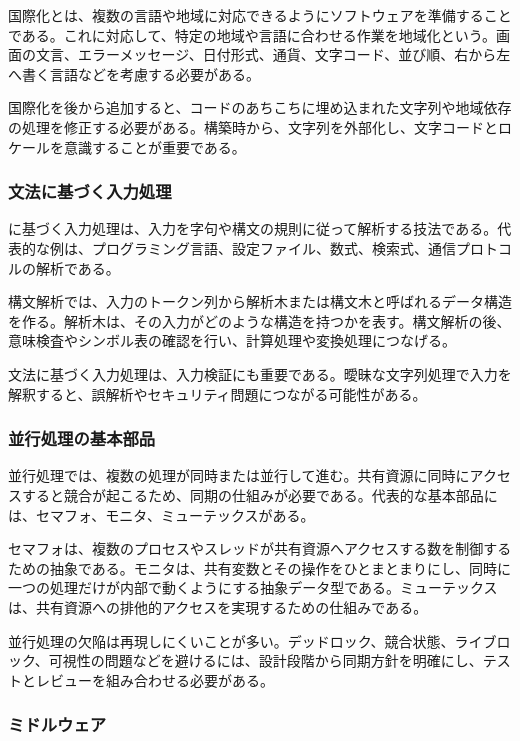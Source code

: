 \documentclass[a4paper,11pt]{ltjsarticle}
\numberwithin{figure}{section}
\numberwithin{table}{section}
\begin{document}
国際化とは、複数の言語や地域に対応できるようにソフトウェアを準備することである。これに対応して、特定の地域や言語に合わせる作業を地域化という。画面の文言、エラーメッセージ、日付形式、通貨、文字コード、並び順、右から左へ書く言語などを考慮する必要がある。

国際化を後から追加すると、コードのあちこちに埋め込まれた文字列や地域依存の処理を修正する必要がある。構築時から、文字列を外部化し、文字コードとロケールを意識することが重要である。

\subsubsection{文法に基づく入力処理}

に基づく入力処理は、入力を字句や構文の規則に従って解析する技法である。代表的な例は、プログラミング言語、設定ファイル、数式、検索式、通信プロトコルの解析である。

構文解析では、入力のトークン列から解析木または構文木と呼ばれるデータ構造を作る。解析木は、その入力がどのような構造を持つかを表す。構文解析の後、意味検査やシンボル表の確認を行い、計算処理や変換処理につなげる。

文法に基づく入力処理は、入力検証にも重要である。曖昧な文字列処理で入力を解釈すると、誤解析やセキュリティ問題につながる可能性がある。

\subsubsection{並行処理の基本部品}

並行処理では、複数の処理が同時または並行して進む。共有資源に同時にアクセスすると競合が起こるため、同期の仕組みが必要である。代表的な基本部品には、セマフォ、モニタ、ミューテックスがある。

セマフォは、複数のプロセスやスレッドが共有資源へアクセスする数を制御するための抽象である。モニタは、共有変数とその操作をひとまとまりにし、同時に一つの処理だけが内部で動くようにする抽象データ型である。ミューテックスは、共有資源への排他的アクセスを実現するための仕組みである。

並行処理の欠陥は再現しにくいことが多い。デッドロック、競合状態、ライブロック、可視性の問題などを避けるには、設計段階から同期方針を明確にし、テストとレビューを組み合わせる必要がある。

\subsubsection{ミドルウェア}
\end{document}
